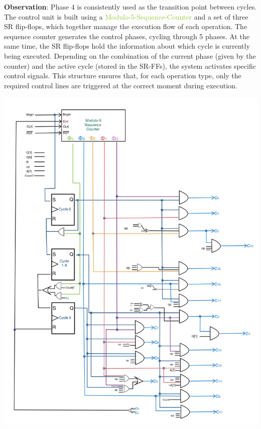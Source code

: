 \documentclass[12pt, letterpaper]{article}
\begin{document}
\textbf{Observation}: Phase 4 is consistently used as the transition point between cycles.\\

The control unit is built using a \textcolor{YellowGreen}{Modulo-5-Sequence-Counter} and a set of three SR flip-flops, which together manage the execution flow of each operation. The sequence counter generates the control phases, cycling through 5 phases. At the same time, the SR flip-flops hold the information about which cycle is currently being executed.
Depending on the combination of the
current phase (given by the counter) and the active cycle (stored in the SR-FFs), the system activates specific control signals. This structure ensures that, for each operation type, only the required control lines are triggered at the correct moment during execution.\\


\begin{center}
\includegraphics[scale=0.3]{Documentation/control_unit}
\end{center}
\end{document}

